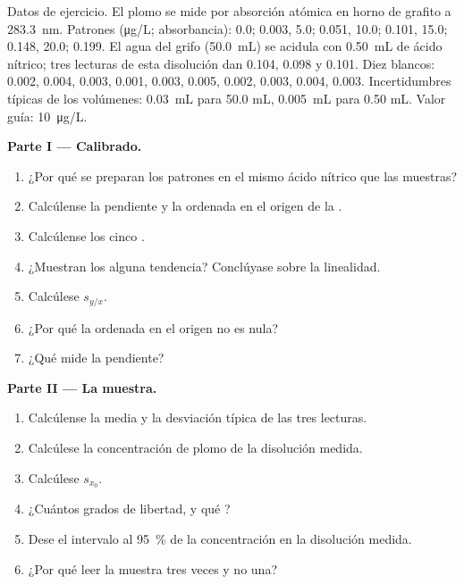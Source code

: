 \begin{problem}
\label{pb:b2:measurement-statistics:1}
Datos de ejercicio. El plomo se mide por absorción atómica en horno de grafito a \qty{283.3}{nm}. Patrones
(\unit{\micro g/L}; absorbancia): 0.0; 0.003, 5.0; 0.051, 10.0; 0.101, 15.0; 0.148, 20.0; 0.199. El
agua del grifo (\qty{50.0}{mL}) se acidula con \qty{0.50}{mL} de ácido nítrico; tres lecturas de esta
disolución dan 0.104, 0.098 y 0.101. Diez blancos: 0.002, 0.004, 0.003, 0.001, 0.003, 0.005, 0.002,
0.003, 0.004, 0.003. Incertidumbres típicas de los volúmenes: \qty{0.03}{mL} para 50.0 mL,
\qty{0.005}{mL} para 0.50 mL. Valor guía: \qty{10}{\micro g/L}.

\medskip
\noindent\textbf{Parte I --- Calibrado.}
\begin{enumerate}
  \item ¿Por qué se preparan los patrones en el mismo ácido nítrico que las muestras?
  \item Calcúlense la pendiente y la ordenada en el origen de la .
  \item Calcúlense los cinco .
  \item ¿Muestran los  alguna tendencia? Conclúyase sobre la linealidad.
  \item Calcúlese $s_{y/x}$.
  \item ¿Por qué la ordenada en el origen no es nula?
  \item ¿Qué mide la pendiente?
\end{enumerate}

\medskip
\noindent\textbf{Parte II --- La muestra.}
\begin{enumerate}[resume]
  \item Calcúlense la media y la desviación típica de las tres lecturas.
  \item Calcúlese la concentración de plomo de la disolución medida.
  \item Calcúlese $s_{x_0}$.
  \item ¿Cuántos grados de libertad, y qué ?
  \item Dese el intervalo al 95~\% de la concentración en la disolución medida.
  \item ¿Por qué leer la muestra tres veces y no una?
\end{enumerate}


\end{problem}
